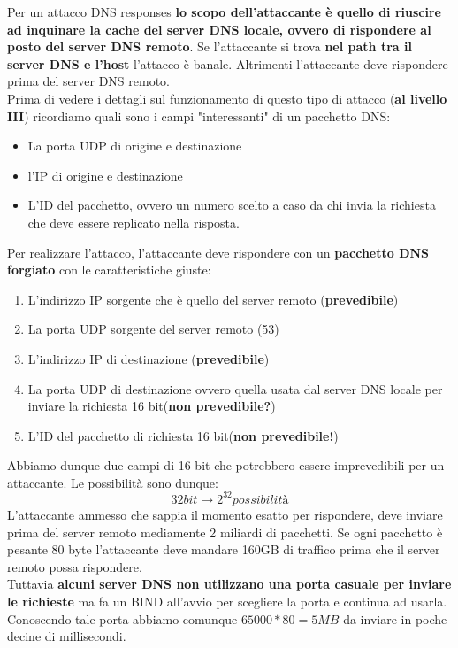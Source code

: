 \documentclass[12pt]{article}
\begin{document}
				Per un attacco DNS responses \textbf{lo scopo dell'attaccante è quello di riuscire ad inquinare la cache del server DNS locale, ovvero di rispondere al posto del server DNS remoto}. Se l'attaccante si trova \textbf{nel path tra il server DNS e l'host } l'attacco è banale. Altrimenti l'attaccante deve rispondere prima del server DNS remoto. \\
				Prima di vedere i dettagli sul funzionamento di questo tipo di attacco (\textbf{al livello III}) ricordiamo quali sono i campi "interessanti" di un pacchetto DNS:
				\begin{itemize}
					\item La porta UDP di origine e destinazione
					\item l'IP  di origine e destinazione
					\item L'ID del pacchetto, ovvero un numero scelto a caso da chi invia la richiesta che deve essere replicato nella risposta.	
				\end{itemize}
				Per realizzare l'attacco, l'attaccante deve rispondere con un \textbf{pacchetto DNS forgiato} con le caratteristiche giuste:
				\begin{enumerate}
					\item L'indirizzo IP sorgente che è quello del server remoto (\textbf{prevedibile})
					\item La porta UDP sorgente del server remoto (53)
					\item L'indirizzo IP di destinazione (\textbf{prevedibile})
					\item La porta UDP di destinazione ovvero quella usata dal server DNS locale per inviare la richiesta 16 bit(\textbf{non prevedibile?})
					\item L'ID del pacchetto di richiesta 16 bit(\textbf{non prevedibile!})
				\end{enumerate}
				Abbiamo dunque due campi di 16 bit che potrebbero essere imprevedibili per un attaccante. Le possibilità sono dunque:
				$$32bit \rightarrow 2^{32} possibilità$$
				L'attaccante ammesso che sappia il momento esatto per rispondere, deve inviare prima del server remoto mediamente 2 miliardi di pacchetti. Se ogni pacchetto è pesante 80 byte l'attaccante deve mandare 160GB di traffico prima che il server remoto possa rispondere.	\\
				Tuttavia \textbf{alcuni server DNS non utilizzano una porta casuale per inviare le richieste} ma fa un BIND all'avvio per scegliere la porta e continua ad usarla. Conoscendo tale porta abbiamo comunque $65000*80 = 5MB$ da inviare in poche decine di millisecondi.\\
\end{document}
